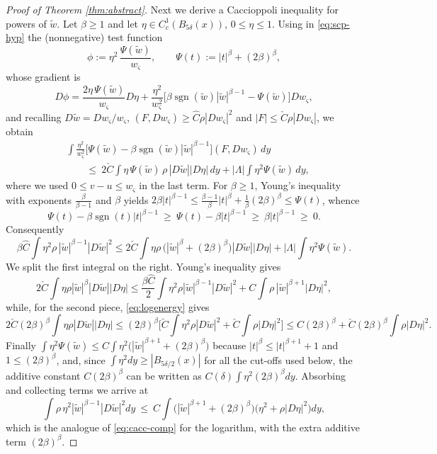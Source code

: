 \documentclass[reqno]{amsart}
\theoremstyle{plain}
\theoremstyle{definition}
\theoremstyle{remark}
\begin{document}
\begin{proof}[Proof of Theorem \ref{thm:abstract}]
Next we derive a Caccioppoli inequality for powers of $\widetilde w$. Let $\beta\ge1$ and let
$\eta\in C_c^1(B_{5\delta}(x))$, $0\le\eta\le1$. Using in \eqref{eq:scp-hyp} the (nonnegative) test
function
\[
\phi:=\eta^2\,\frac{\Psi(\widetilde w)}{w_\varsigma},\qquad \Psi(t):=|t|^{\beta}+(2\beta)^{\beta},
\]
whose gradient is
\[
D\phi=\frac{2\eta\,\Psi(\widetilde w)}{w_\varsigma}D\eta
+\frac{\eta^2}{w_\varsigma^{2}}\Big[\beta\operatorname{sgn}(\widetilde w)|\widetilde w|^{\beta-1}-\Psi(\widetilde w)\Big]Dw_\varsigma ,
\]
and recalling $D\widetilde w=Dw_\varsigma/w_\varsigma$, $(F,Dw_\varsigma)\ge\hat C\rho|Dw_\varsigma|^2$
and $|F|\le\check C\rho|Dw_\varsigma|$, we obtain
\begin{align*}
&\int\frac{\eta^2}{w_\varsigma^{2}}\Big[\Psi(\widetilde w)-\beta\operatorname{sgn}(\widetilde w)|\widetilde w|^{\beta-1}\Big](F,Dw_\varsigma)\,dy\\
&\qquad\le\ 2\check C\int\eta\,\Psi(\widetilde w)\,\rho\,|D\widetilde w||D\eta|\,dy
+|\Lambda|\int\eta^2\Psi(\widetilde w)\,dy ,
\end{align*}
where we used $0\le v-u\le w_\varsigma$ in the last term. For $\beta\ge1$, Young's inequality with
exponents $\frac{\beta}{\beta-1}$ and $\beta$ yields
$2\beta|t|^{\beta-1}\le\frac{\beta-1}{\beta}|t|^{\beta}+\frac1\beta(2\beta)^{\beta}\le\Psi(t)$,
whence
\begin{equation}\label{eq:elem}
\Psi(t)-\beta\operatorname{sgn}(t)|t|^{\beta-1}\ \ge\ \Psi(t)-\beta|t|^{\beta-1}\ \ge\ \beta|t|^{\beta-1}\ \ge\ 0 .
\end{equation}
Consequently
\[
\beta\hat C\int\eta^2\rho\,|\widetilde w|^{\beta-1}|D\widetilde w|^2
\le 2\check C\int\eta\rho\,\big(|\widetilde w|^{\beta}+(2\beta)^{\beta}\big)|D\widetilde w||D\eta|
+|\Lambda|\int\eta^2\Psi(\widetilde w) .
\]
We split the first integral on the right. Young's inequality gives
\[
2\check C\int\eta\rho|\widetilde w|^{\beta}|D\widetilde w||D\eta|
\le\frac{\beta\hat C}{2}\int\eta^2\rho|\widetilde w|^{\beta-1}|D\widetilde w|^2
+C\int\rho\,|\widetilde w|^{\beta+1}|D\eta|^2 ,
\]
while, for the second piece, \eqref{eq:logenergy} gives
\[
2\check C(2\beta)^{\beta}\int\eta\rho|D\widetilde w||D\eta|
\le (2\beta)^{\beta}\Big[\check C\int\eta^2\rho|D\widetilde w|^2+\check C\int\rho|D\eta|^2\Big]
\le C(2\beta)^{\beta}+\check C(2\beta)^\beta\int\rho|D\eta|^2 .
\]
Finally $\int\eta^2\Psi(\widetilde w)\le C\int\eta^2\big(|\widetilde w|^{\beta+1}+(2\beta)^{\beta}\big)$
because $|t|^{\beta}\le|t|^{\beta+1}+1$ and $1\le(2\beta)^{\beta}$, and, since
$\int\eta^2 dy\ge|B_{5\delta/2}(x)|$ for all the cut-offs used below, the additive constant
$C(2\beta)^{\beta}$ can be written as $C(\delta)\int\eta^2(2\beta)^{\beta}dy$. Absorbing and
collecting terms we arrive at
\begin{equation}\label{eq:cacc-log-beta}
\int\rho\,\eta^2|\widetilde w|^{\beta-1}|D\widetilde w|^2dy\ \le\
C\int\big(|\widetilde w|^{\beta+1}+(2\beta)^{\beta}\big)\big(\eta^2+\rho|D\eta|^2\big)dy ,
\end{equation}
which is the analogue of \eqref{eq:cacc-comp} for the logarithm, with the extra additive term
$(2\beta)^{\beta}$.


\end{proof}
\end{document}
